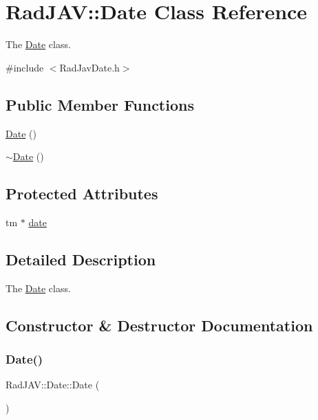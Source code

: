 \hypertarget{class_rad_j_a_v_1_1_date}{}\section{Rad\+J\+AV\+:\+:Date Class Reference}
\label{class_rad_j_a_v_1_1_date}


The \mbox{\hyperlink{class_rad_j_a_v_1_1_date}{Date}} class.  




{\ttfamily \#include $<$Rad\+Jav\+Date.\+h$>$}

\subsection*{Public Member Functions}
\begin{DoxyCompactItemize}
\item 
\mbox{\hyperlink{class_rad_j_a_v_1_1_date_aa0daed62f0af3e94f80d4e1871304bd5}{Date}} ()
\item 
\mbox{\hyperlink{class_rad_j_a_v_1_1_date_a3a74fb42f5bdae383b95b42bb83beb2f}{$\sim$\+Date}} ()
\end{DoxyCompactItemize}
\subsection*{Protected Attributes}
\begin{DoxyCompactItemize}
\item 
tm $\ast$ \mbox{\hyperlink{class_rad_j_a_v_1_1_date_a6cda5db94bdee29181ec009709f00de3}{date}}
\end{DoxyCompactItemize}


\subsection{Detailed Description}
The \mbox{\hyperlink{class_rad_j_a_v_1_1_date}{Date}} class. 

\subsection{Constructor \& Destructor Documentation}
\mbox{\label{class_rad_j_a_v_1_1_date_aa0daed62f0af3e94f80d4e1871304bd5}} 
\subsubsection{\texorpdfstring{Date()}{Date()}}
{\footnotesize\ttfamily Rad\+J\+A\+V\+::\+Date\+::\+Date (\begin{DoxyParamCaption}{ }\end{DoxyParamCaption})}

